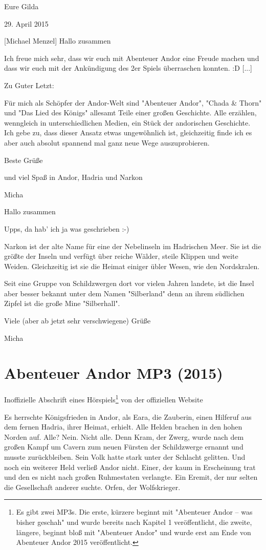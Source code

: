 \documentclass[10pt, a4paper, oneside]{book}
\newcommand{\fillbreak}{\vspace*{\fill}\columnbreak}
\newcommand{\storytext}[1]{%
    \section{#1}%
    \label{Storytext: #1}%
}
\begin{document}
\begin{multicols}{2}
Eure Gilda

\begin{center}
    29. April 2015
\end{center}


[Michael Menzel] Hallo zusammen

Ich freue mich sehr, dass wir euch mit Abenteuer Andor eine Freude machen und dass wir euch mit der Ankündigung des 2er Spiels überraschen konnten. :D [...]

Zu Guter Letzt:

Für mich als Schöpfer der Andor-Welt sind "Abenteuer Andor", "Chada \& Thorn" und "Das Lied des Königs" allesamt Teile einer großen Geschichte. Alle erzählen, wenngleich in unterschiedlichen Medien, ein Stück der andorischen Geschichte. Ich gebe zu, dass dieser Ansatz etwas ungewöhnlich ist, gleichzeitig finde ich es aber auch absolut spannend mal ganz neue Wege auszuprobieren.


Beste Grüße

und viel Spaß in Andor, Hadria und Narkon

Micha

Hallo zusammen

Upps, da hab' ich ja was geschrieben :-)

Narkon ist der alte Name für eine der Nebelinseln im Hadrischen Meer. Sie ist die größte der Inseln und verfügt über reiche Wälder, steile Klippen und weite Weiden. Gleichzeitig ist sie die Heimat einiger übler Wesen, wie den Nordskralen.

Seit eine Gruppe von Schildzwergen dort vor vielen Jahren landete, ist die Insel aber besser bekannt unter dem Namen "Silberland" denn an ihrem südlichen Zipfel ist die große Mine "Silberhall".


Viele (aber ab jetzt sehr verschwiegene) Grüße

Micha



\fillbreak
\storytext{Abenteuer Andor MP3 (2015)}

\begin{center}
    Inoffizielle Abschrift eines Hörspiels\footnote{Es gibt zwei MP3s. Die erste, kürzere beginnt mit "Abenteuer Andor – was bisher geschah" und wurde bereits nach Kapitel 1 veröffentlicht, die zweite, längere, beginnt bloß mit "Abenteuer Andor" und wurde erst am Ende von Abenteuer Andor 2015 veröffentlicht.} von der offiziellen Website
\end{center}

Es herrschte Königsfrieden in Andor, als Eara, die Zauberin, einen Hilferuf aus dem fernen Hadria, ihrer Heimat, erhielt. Alle Helden brachen in den hohen Norden auf. Alle? Nein. Nicht alle. Denn Kram, der Zwerg, wurde nach dem großen Kampf um Cavern zum neuen Fürsten der Schildzwerge ernannt und musste zurückbleiben. Sein Volk hatte stark unter der Schlacht gelitten. Und noch ein weiterer Held verließ Andor nicht. Einer, der kaum in Erscheinung trat und den es nicht nach großen Ruhmestaten verlangte. Ein Eremit, der nur selten die Gesellschaft anderer suchte. Orfen, der Wolfskrieger.


\end{multicols}
\end{document}
